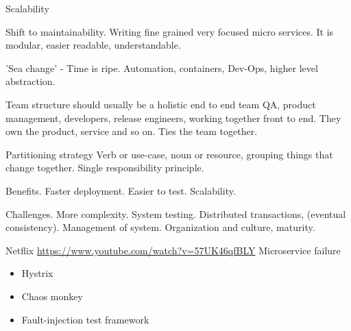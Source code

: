 Scalability 

Shift to maintainability. Writing fine grained very focused micro services. It is modular, easier readable, understandable.

'Sea change' - Time is ripe. Automation, containers, Dev-Ops, higher level abstraction.

Team structure should usually be a holistic end to end team QA, product management, developers, release engineers, working together front to end. They own the product, service and so on. Ties the team together.

Partitioning strategy Verb or use-case, noun or resource, grouping things that change together. Single responsibility principle.

Benefits. Faster deployment. Easier to test. Scalability.

Challenges.
More complexity. System testing. Distributed transactions, (eventual consistency). Management of system.
Organization and culture, maturity.

Netflix
\url{https://www.youtube.com/watch?v=57UK46qfBLY}
Microservice failure
\begin{itemize}
\item Hystrix
\item Chaos monkey
\item Fault-injection test framework
\end{itemize}